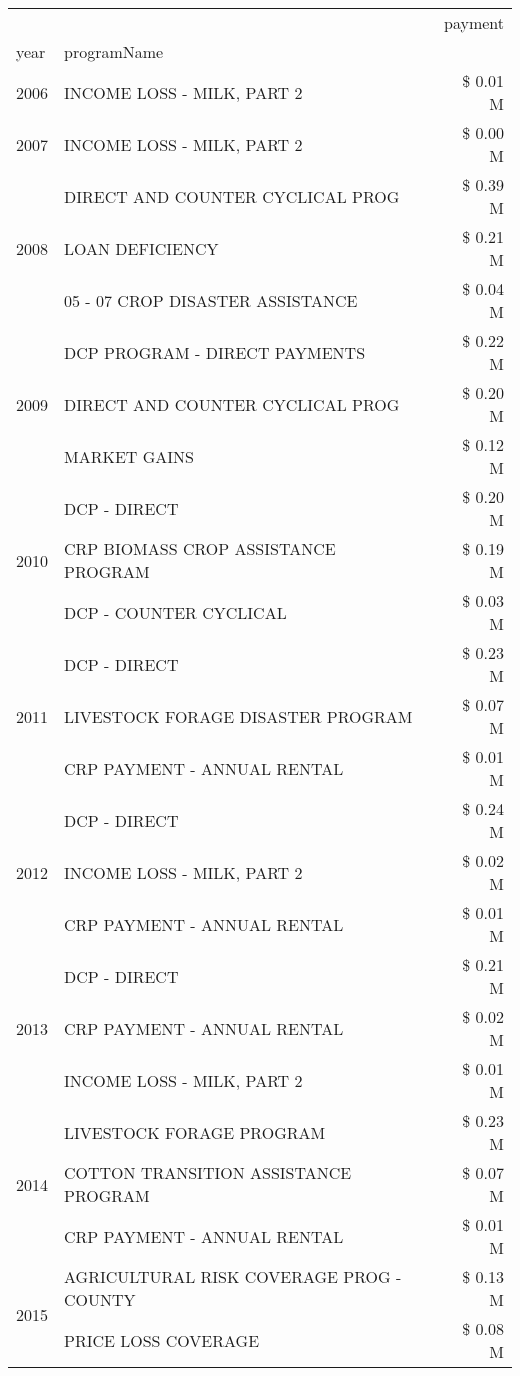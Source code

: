 \begin{tabular}{llr}
\toprule
 &  & payment \\
year & programName &  \\
\midrule
2006 & INCOME LOSS - MILK, PART 2 & \$ 0.01 M \\
\cline{1-3}
2007 & INCOME LOSS - MILK, PART 2 & \$ 0.00 M \\
\cline{1-3}
\multirow[t]{3}{*}{2008} & DIRECT AND COUNTER CYCLICAL PROG & \$ 0.39 M \\
 & LOAN DEFICIENCY & \$ 0.21 M \\
 & 05 - 07 CROP DISASTER ASSISTANCE & \$ 0.04 M \\
\cline{1-3}
\multirow[t]{3}{*}{2009} & DCP PROGRAM - DIRECT PAYMENTS & \$ 0.22 M \\
 & DIRECT AND COUNTER CYCLICAL PROG & \$ 0.20 M \\
 & MARKET GAINS & \$ 0.12 M \\
\cline{1-3}
\multirow[t]{3}{*}{2010} & DCP - DIRECT & \$ 0.20 M \\
 & CRP BIOMASS CROP ASSISTANCE PROGRAM & \$ 0.19 M \\
 & DCP - COUNTER CYCLICAL & \$ 0.03 M \\
\cline{1-3}
\multirow[t]{3}{*}{2011} & DCP - DIRECT & \$ 0.23 M \\
 & LIVESTOCK FORAGE DISASTER PROGRAM & \$ 0.07 M \\
 & CRP PAYMENT - ANNUAL RENTAL & \$ 0.01 M \\
\cline{1-3}
\multirow[t]{3}{*}{2012} & DCP - DIRECT & \$ 0.24 M \\
 & INCOME LOSS - MILK, PART 2 & \$ 0.02 M \\
 & CRP PAYMENT - ANNUAL RENTAL & \$ 0.01 M \\
\cline{1-3}
\multirow[t]{3}{*}{2013} & DCP - DIRECT & \$ 0.21 M \\
 & CRP PAYMENT - ANNUAL RENTAL & \$ 0.02 M \\
 & INCOME LOSS - MILK, PART 2 & \$ 0.01 M \\
\cline{1-3}
\multirow[t]{3}{*}{2014} & LIVESTOCK FORAGE PROGRAM & \$ 0.23 M \\
 & COTTON TRANSITION ASSISTANCE PROGRAM & \$ 0.07 M \\
 & CRP PAYMENT - ANNUAL RENTAL & \$ 0.01 M \\
\cline{1-3}
\multirow[t]{3}{*}{2015} & AGRICULTURAL RISK COVERAGE PROG - COUNTY & \$ 0.13 M \\
 & PRICE LOSS COVERAGE & \$ 0.08 M \\

\end{tabular}
